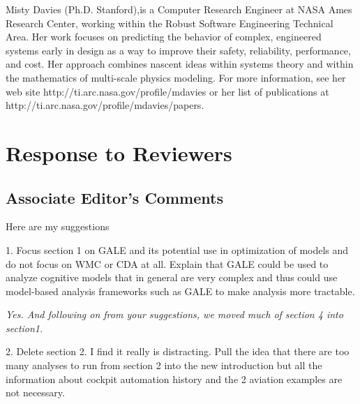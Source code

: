 \documentclass[journal]{IEEEtran}
\begin{document}
\begin{IEEEbiography}{Misty Davies}
(Ph.D. Stanford),is a Computer Research Engineer at
  NASA Ames Research Center, working within the
  Robust Software Engineering Technical Area.  Her
  work focuses on predicting the behavior of
  complex, engineered systems early in design as a
  way to improve their safety, reliability,
  performance, and cost. Her approach combines
  nascent ideas within systems theory and within the
  mathematics of multi-scale physics modeling.
For more information, see her web site http://ti.arc.nasa.gov/profile/mdavies
or her  list of publications at
http://ti.arc.nasa.gov/profile/mdavies/papers.
\end{IEEEbiography}

\clearpage

\section*{Response to Reviewers}

\subsection*{Associate Editor's Comments}


Here are my suggestions

1.      Focus section 1 on GALE and its potential use in optimization of  models and do not focus on WMC or CDA at all. Explain that GALE could be used to analyze cognitive models that in general are very complex and thus could use model-based analysis frameworks such as GALE to make analysis more tractable.

{\em Yes. And following on from your suggestions, we moved much of section 4 into section1.}

2.      Delete section 2. I find it really is distracting. Pull the idea that there are too many analyses to run from section 2 into the new introduction but all the information about cockpit automation history and the 2 aviation examples are not necessary.
\end{document}
